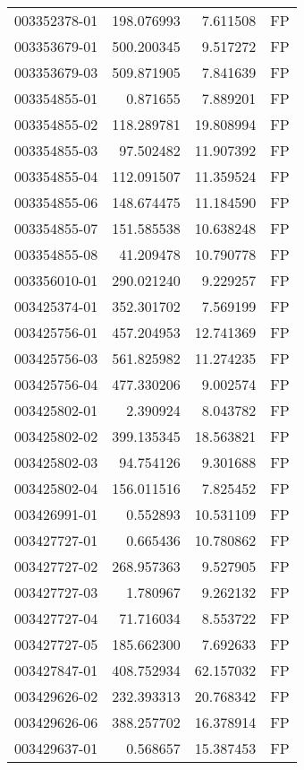 \begin{tabular}{lrrl}
003352378-01 &  198.076993 &     7.611508 &   FP \\
003353679-01 &  500.200345 &     9.517272 &   FP \\
003353679-03 &  509.871905 &     7.841639 &   FP \\
003354855-01 &    0.871655 &     7.889201 &   FP \\
003354855-02 &  118.289781 &    19.808994 &   FP \\
003354855-03 &   97.502482 &    11.907392 &   FP \\
003354855-04 &  112.091507 &    11.359524 &   FP \\
003354855-06 &  148.674475 &    11.184590 &   FP \\
003354855-07 &  151.585538 &    10.638248 &   FP \\
003354855-08 &   41.209478 &    10.790778 &   FP \\
003356010-01 &  290.021240 &     9.229257 &   FP \\
003425374-01 &  352.301702 &     7.569199 &   FP \\
003425756-01 &  457.204953 &    12.741369 &   FP \\
003425756-03 &  561.825982 &    11.274235 &   FP \\
003425756-04 &  477.330206 &     9.002574 &   FP \\
003425802-01 &    2.390924 &     8.043782 &   FP \\
003425802-02 &  399.135345 &    18.563821 &   FP \\
003425802-03 &   94.754126 &     9.301688 &   FP \\
003425802-04 &  156.011516 &     7.825452 &   FP \\
003426991-01 &    0.552893 &    10.531109 &   FP \\
003427727-01 &    0.665436 &    10.780862 &   FP \\
003427727-02 &  268.957363 &     9.527905 &   FP \\
003427727-03 &    1.780967 &     9.262132 &   FP \\
003427727-04 &   71.716034 &     8.553722 &   FP \\
003427727-05 &  185.662300 &     7.692633 &   FP \\
003427847-01 &  408.752934 &    62.157032 &   FP \\
003429626-02 &  232.393313 &    20.768342 &   FP \\
003429626-06 &  388.257702 &    16.378914 &   FP \\
003429637-01 &    0.568657 &    15.387453 &   FP \\

\end{tabular}
